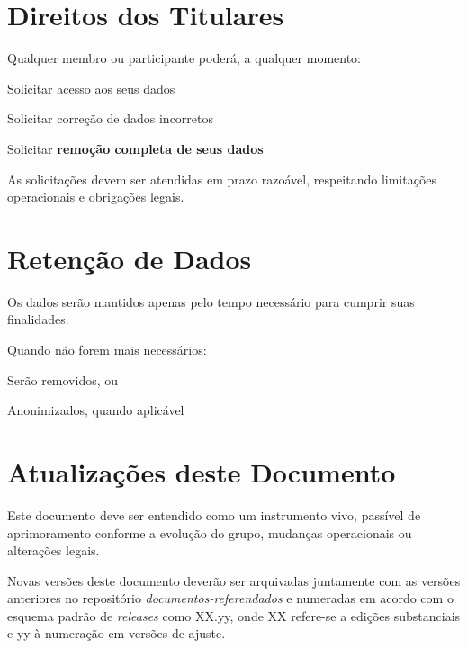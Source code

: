 \documentclass[
  12pt,          %
  a4paper,       %
  oneside,       %
  brazil         %
]{article}
\begin{document}
\section{Direitos dos Titulares}

Qualquer membro ou participante poderá, a qualquer momento:

\begin{privacidade}
	\item Solicitar acesso aos seus dados
	\item Solicitar correção de dados incorretos
	\item Solicitar \textbf{remoção completa de seus dados}
\end{privacidade}

As solicitações devem ser atendidas em prazo razoável, respeitando limitações operacionais e obrigações legais.

\section{Retenção de Dados}

Os dados serão mantidos apenas pelo tempo necessário para cumprir suas finalidades.

Quando não forem mais necessários:

\begin{privacidade}
	\item Serão removidos, ou
	\item Anonimizados, quando aplicável
\end{privacidade}

\section{Atualizações deste Documento}

Este documento deve ser entendido como um instrumento vivo, passível de aprimoramento conforme a evolução do grupo, mudanças operacionais ou alterações legais. 

Novas versões deste documento deverão ser arquivadas juntamente com as versões anteriores no repositório \textit{documentos-referendados} e numeradas em acordo
 com o esquema padrão de \textit{releases} como XX.yy, onde XX refere-se a edições substanciais e yy à numeração em versões de ajuste. 
 
\end{document}
